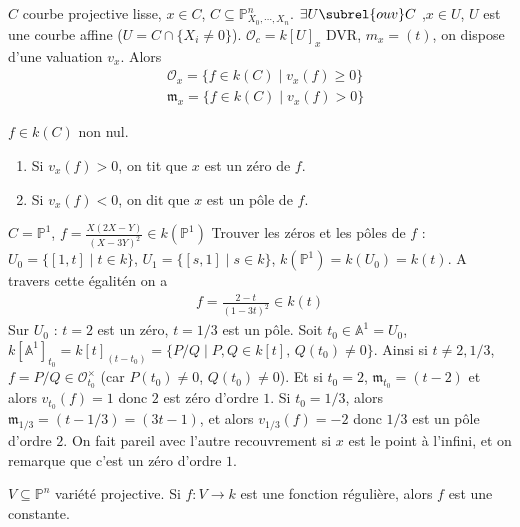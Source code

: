         $C$ courbe projective lisse, $x \in C$, $C \subseteq \mathbb{P}^n_{X_0, \cdots, X_n}$. $\exists U \subrel{ouv} C$ ,$x \in U$, $U$ est une courbe affine ($U = C \cap \{X_i \neq 0\}$). $\mathcal{O}_c = k[U]_x$ DVR, $m_x = (t)$, on dispose d'une valuation $v_x$. Alors
        \begin{align*}
            & \mathcal{O}_x = \{f \in k(C) \mid v_x(f) \geq 0\} \\
            & \mathfrak{m}_x = \{f \in k(C) \mid v_x(f) > 0\}
        \end{align*}
        \begin{defi}
            $f \in k(C)$ non nul.
            \begin{enumerate}
                \item Si $v_x(f) > 0$, on tit que $x$ est un zéro de $f$.
                \item Si $v_x(f) < 0$, on dit que $x$ est un pôle de $f$. 
            \end{enumerate}
        \end{defi}
        \begin{expl}
            $C = \mathbb{P}^1$, $f = \frac{X(2X - Y)}{(X - 3Y)^2} \in k(\mathbb{P}^1)$ Trouver les zéros et les pôles de $f$ : $U_0 = \{[1,t] \mid t \in k\}$, $U_1 = \{[s,1] \mid s \in k\}$, $k(\mathbb{P}^1) = k(U_0) = k(t)$. A travers cette égalitén on a
            \begin{align*}
                f = \frac{2 - t}{(1 - 3t)^2} \in k(t)
            \end{align*}
            Sur $U_0$ : $t = 2$ est un zéro, $t = 1/3$ est un pôle. Soit $t_0 \in \mathbb{A}^1 = U_0$, $k[\mathbb{A}^1]_{t_0} = k[t]_{(t - t_0)} = \{P/Q \mid P,Q \in k[t],\, Q(t_0) \neq 0\}$. Ainsi si $t \neq 2,1/3$, $f = P/Q \in \mathcal{O}^\times_{t_0}$ (car $P(t_0) \neq 0$, $Q(t_0) \neq 0$). Et si $t_0 = 2$, $\mathfrak{m}_{t_0} = (t - 2)$ et alors $v_{t_0}(f) = 1$ donc $2$ est zéro d'ordre $1$. Si $t_0 = 1/3$, alors $\mathfrak{m}_{1/3} = (t - 1/3) = (3t - 1)$, et alors $v_{1/3}(f) = -2$ donc $1/3$ est un pôle d'ordre $2$.
            On fait pareil avec l'autre recouvrement si $x$ est le point à l'infini, et on remarque que c'est un zéro d'ordre $1$. 
        \end{expl}
        \begin{theo}
            $V \subseteq \mathbb{P}^n$ variété projective. Si $f : V \to k$ est une fonction régulière, alors $f$ est une constante. 
        \end{theo}
